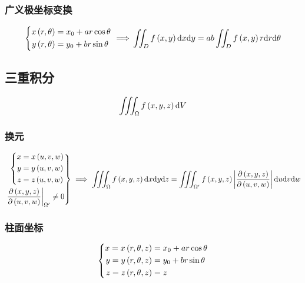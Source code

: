 \documentclass{article}
\begin{document}
\subsubsection{广义极坐标变换}

\[\left\{\begin{aligned}
        x\left(r,\theta\right) & =x_0+ar\cos\theta \\
        y\left(r,\theta\right) & =y_0+br\sin\theta
    \end{aligned}\right.\implies\\
    \iint_Df\left(x,y\right)\mathrm d x\mathrm d y=
    ab\iint_Df\left(x,y\right)r\mathrm d r\mathrm d\theta\]

\subsection{三重积分}

\begin{definition}[$\d V=\d x\d y\d z$]
    \[\iiint_\Omega f\left(x,y,z\right)\mathrm d V\]
\end{definition}

\subsubsection{换元}

\[\left.\begin{aligned}
        \left\{\begin{aligned}
                   x & =x\left(u,v,w\right) \\
                   y & =y\left(u,v,w\right) \\
                   z & =z\left(u,v,w\right)
               \end{aligned}\right. \\
        \left.\frac{\partial\left(x,y,z\right)}{\partial\left(u,v,w\right)}\right|_{\Omega^\prime}\neq0
    \end{aligned}\right\}\implies
    \iiint_\Omega f\left(x,y,z\right)\mathrm d x\mathrm d y\mathrm d z=
    \iiint_{\Omega^\prime}f\left(x,y,z\right)\left|\frac{\partial\left(x,y,z\right)}{\partial\left(u,v,w\right)}\right|\mathrm d u\mathrm d v\mathrm d w\]

\subsubsection{柱面坐标}

\[\left\{\begin{aligned}
        x=x\left(r,\theta,z\right) & =x_0+ar\cos\theta \\
        y=y\left(r,\theta,z\right) & =y_0+br\sin\theta \\
        z=z\left(r,\theta,z\right) & =z
    \end{aligned}\right.\]
\end{document}
